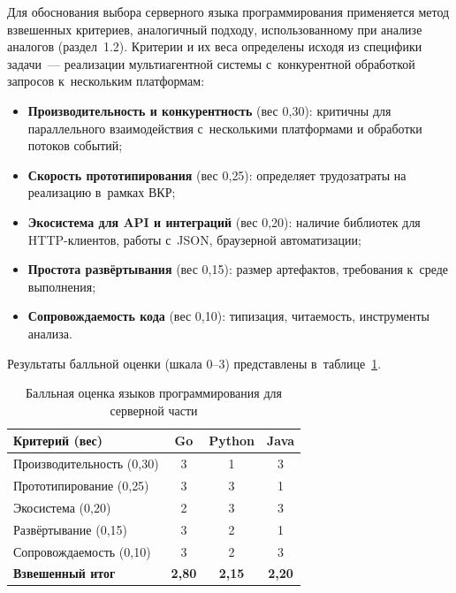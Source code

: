 Для обоснования выбора серверного языка программирования применяется метод взвешенных критериев, аналогичный подходу, использованному при анализе аналогов (раздел~1.2). Критерии и их веса определены исходя из специфики задачи~--- реализации мультиагентной системы с~конкурентной обработкой запросов к~нескольким платформам:

\begin{itemize}
  \item \textbf{Производительность и конкурентность} (вес 0{,}30): критичны для параллельного взаимодействия с~несколькими платформами и обработки потоков событий;
  \item \textbf{Скорость прототипирования} (вес 0{,}25): определяет трудозатраты на реализацию в~рамках ВКР;
  \item \textbf{Экосистема для API и интеграций} (вес 0{,}20): наличие библиотек для HTTP-клиентов, работы с~JSON, браузерной автоматизации;
  \item \textbf{Простота развёртывания} (вес 0{,}15): размер артефактов, требования к~среде выполнения;
  \item \textbf{Сопровождаемость кода} (вес 0{,}10): типизация, читаемость, инструменты анализа.
\end{itemize}

Результаты балльной оценки (шкала 0--3) представлены в~таблице~\ref{tab:lang-compare}.

\begin{table}[H]
  \caption{Балльная оценка языков программирования для серверной части}
  \label{tab:lang-compare}
  \small
  \begin{tabularx}{\textwidth}{|X|c|c|c|}
    \hline
    \textbf{Критерий (вес)} & \textbf{Go} & \textbf{Python} & \textbf{Java} \\
    \hline
    Производительность (0{,}30) & 3 & 1 & 3 \\
    \hline
    Прототипирование (0{,}25) & 3 & 3 & 1 \\
    \hline
    Экосистема (0{,}20) & 2 & 3 & 3 \\
    \hline
    Развёртывание (0{,}15) & 3 & 2 & 1 \\
    \hline
    Сопровождаемость (0{,}10) & 3 & 2 & 3 \\
    \hline
    \textbf{Взвешенный итог} & \textbf{2{,}80} & \textbf{2{,}15} & \textbf{2{,}20} \\
    \hline
  \end{tabularx}
\end{table}

